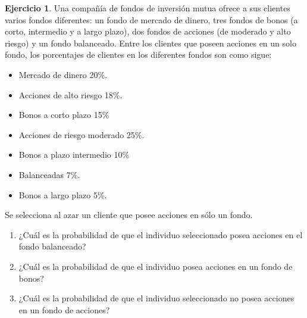 \documentclass[
  11pt,
]{book}
\providecommand{\tightlist}{%
  \setlength{\itemsep}{0pt}\setlength{\parskip}{0pt}}
\theoremstyle{definition}
\theoremstyle{definition}
\theoremstyle{definition}
\newtheorem{exercise}{Ejercicio}[chapter]
\theoremstyle{definition}
\theoremstyle{remark}
\begin{document}
\begin{exercise}

Una compañía de fondos de inversión mutua ofrece a sus clientes varios fondos diferentes: un fondo de mercado de dinero, tres fondos de bonos (a corto, intermedio y a largo plazo), dos fondos de acciones (de moderado y alto riesgo) y un fondo balanceado. Entre los clientes que poseen acciones en un solo fondo, los porcentajes de clientes en los diferentes fondos son como sigue:

\begin{itemize}
\tightlist
\item
  Mercado de dinero 20\%.
\item
  Acciones de alto riesgo 18\%.
\item
  Bonos a corto plazo 15\%
\item
  Acciones de riesgo moderado 25\%.
\item
  Bonos a plazo intermedio 10\%
\item
  Balanceadas 7\%.
\item
  Bonos a largo plazo 5\%.
\end{itemize}

Se selecciona al azar un cliente que posee acciones en sólo un fondo.

\begin{enumerate}
\def\labelenumi{\alph{enumi}.}
\item
  ¿Cuál es la probabilidad de que el individuo seleccionado posea acciones en el fondo balanceado?
\item
  ¿Cuál es la probabilidad de que el individuo posea acciones en un fondo de bonos?
\item
  ¿Cuál es la probabilidad de que el individuo seleccionado no posea acciones en un fondo de acciones?
\end{enumerate}

\end{exercise}
\end{document}
